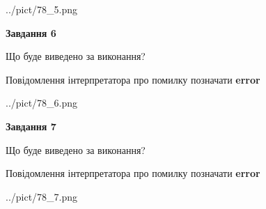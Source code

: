 \documentclass[10pt, ukrainian]{article}
\begin{document}
{\begin {large}
\begin{center}
	{../pict/78_5.png}
\end{center}
\newpage

{\begin {center}\textbf{Завдання 6}\end {center}}\par
Що буде виведено за виконання? \par
Повідомлення інтерпретатора про помилку позначати \textbf{error}

\begin{center}
	{../pict/78_6.png}
\end{center}
\newpage

{\begin {center}\textbf{Завдання 7}\end {center}}\par
Що буде виведено за виконання? \par
Повідомлення інтерпретатора про помилку позначати \textbf{error}

\begin{center}
	{../pict/78_7.png}
\end{center}
\newpage

\end {large}}
\end{document}
